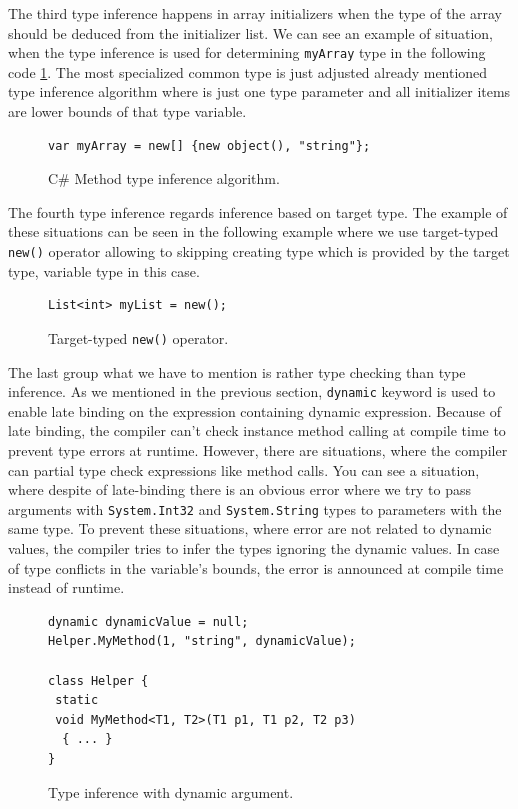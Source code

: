 The third type inference happens in array initializers when the type of the array should be deduced from the initializer list.
We can see an example of situation, when the type inference is used for determining \texttt{myArray} type in the following code \ref{img08:arrayTypeInference}.
The most specialized common type is just adjusted already mentioned type inference algorithm where is just one type parameter and all initializer items are lower bounds of that type variable.
\par
\begin{figure}
\begin{lstlisting}[style=csharp]
var myArray = new[] {new object(), "string"};
\end{lstlisting}
\caption{C\# Method type inference algorithm.}
\label{img08:arrayTypeInference}
\end{figure}
\par
{}
The fourth type inference regards inference based on target type.
The example of these situations can be seen in the following example where we use target-typed \texttt{new()} operator allowing to skipping creating type which is provided by the target type, variable type in this case.
\par
\begin{figure}
\begin{lstlisting}[style=csharp]
List<int> myList = new();
\end{lstlisting}
\caption{Target-typed \texttt{new()} operator.}
\label{img09:targetTypeInference}
\end{figure}
\par
{}
The last group what we have to mention is rather type checking than type inference.
As we mentioned in the previous section, \texttt{dynamic} keyword is used to enable late binding on the expression containing dynamic expression.
Because of late binding, the compiler can't check instance method calling at compile time to prevent type errors at runtime.
However, there are situations, where the compiler can partial type check expressions like method calls.
You can see a situation, where despite of late-binding there is an obvious error where we try to pass arguments with \texttt{System.Int32} and \texttt{System.String} types to parameters with the same type.
To prevent these situations, where error are not related to dynamic values, the compiler tries to infer the types ignoring the dynamic values.
In case of type conflicts in the variable's bounds, the error is announced at compile time instead of runtime.
\par
\begin{figure}
\begin{lstlisting}[style=csharp]
dynamic dynamicValue = null;
Helper.MyMethod(1, "string", dynamicValue);

class Helper {
 static
 void MyMethod<T1, T2>(T1 p1, T1 p2, T2 p3) 
  { ... }
}
\end{lstlisting}
\caption{Type inference with dynamic argument.}
\label{img010:dynamicChecking}
\end{figure}

